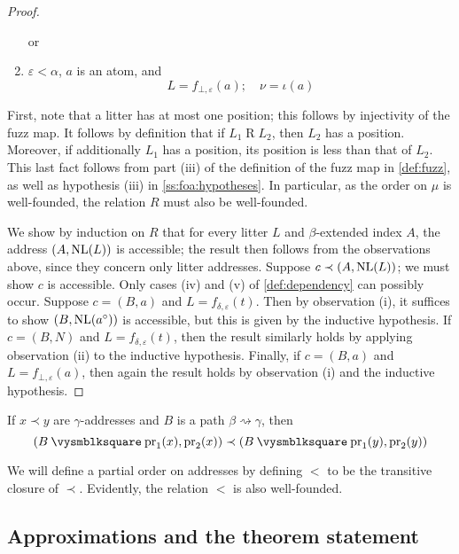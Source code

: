 \begin{proof}
\begin{enumerate}
        or
        \item \( \varepsilon < \alpha \), \( a \) is an atom, and
        \[ L = f_{\bot,\varepsilon}(a); \quad \nu = \iota(a) \]
    \end{enumerate}
    First, note that a litter has at most one position; this follows by injectivity of the fuzz map.
    It follows by definition that if \( L_1 \mathrel{R} L_2 \), then \( L_2 \) has a position.
    Moreover, if additionally \( L_1 \) has a position, its position is less than that of \( L_2 \).
    This last fact follows from part (iii) of the definition of the fuzz map in \cref{def:fuzz}, as well as hypothesis (iii) in \cref{ss:foa:hypotheses}.
    In particular, as the order on \( \mu \) is well-founded, the relation \( R \) must also be well-founded.

    We show by induction on \( R \) that for every litter \( L \) and \( \beta \)-extended index \( A \), the address \( (A, \operatorname{NL}(L)) \) is accessible; the result then follows from the observations above, since they concern only litter addresses.
    Suppose \( c \prec (A, \operatorname{NL}(L)) \); we must show \( c \) is accessible.
    Only cases (iv) and (v) of \cref{def:dependency} can possibly occur.
    Suppose \( c = (B, a) \) and \( L = f_{\delta,\varepsilon}(t) \).
    Then by observation (i), it suffices to show \( (B, \operatorname{NL}(a^\circ)) \) is accessible, but this is given by the inductive hypothesis.
    If \( c = (B, N) \) and \( L = f_{\delta,\varepsilon}(t) \), then the result similarly holds by applying observation (ii) to the inductive hypothesis.
    Finally, if \( c = (B, a) \) and \( L = f_{\bot,\varepsilon}(a) \), then again the result holds by observation (i) and the inductive hypothesis.
\end{proof}

\begin{remark}
    If \( x \prec y \) are \( \gamma \)-addresses and \( B \) is a path \( \beta \rightsquigarrow \gamma \), then
    \[ (B \pcomp \pr_1(x), \pr_2(x)) \prec (B \pcomp \pr_1(y), \pr_2(y)) \]
\end{remark}

We will define a partial order on addresses by defining \( < \) to be the transitive closure of \( \prec \).
Evidently, the relation \( < \) is also well-founded.

\subsection{Approximations and the theorem statement}

